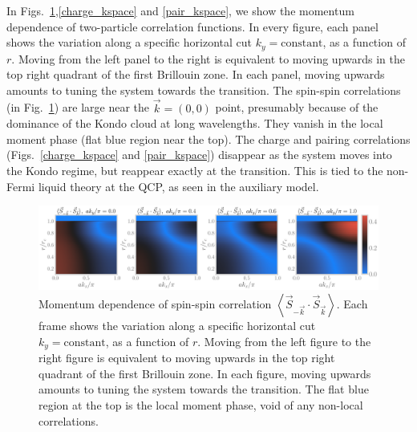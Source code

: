 \documentclass{report}
\numberwithin{equation}{section}
\begin{document}
In Figs.~\ref{spin_kspace},\ref{charge_kspace} and \ref{pair_kspace}, we show the momentum dependence of two-particle correlation functions. In every figure, each panel shows the variation along a specific horizontal cut \(k_y=\text{constant}\), as a function of \(r\). Moving from the left panel to the right is equivalent to moving upwards in the top right quadrant of the first Brillouin zone. In each panel, moving upwards amounts to tuning the system towards the transition. The spin-spin correlations (in Fig.~\ref{spin_kspace}) are large near the \(\vec k = \left( 0,0 \right) \) point, presumably because of the dominance of the Kondo cloud at long wavelengths. They vanish in the local moment phase (flat blue region near the top). The charge and pairing correlations (Figs.~\ref{charge_kspace} and \ref{pair_kspace}) disappear as the system moves into the Kondo regime, but reappear exactly at the transition. This is tied to the non-Fermi liquid theory at the QCP, as seen in the auxiliary model.
\begin{figure}[!htb]
\centering
\includegraphics[width=\textwidth]{spin_kspace_all.pdf}
\caption{Momentum dependence of spin-spin correlation \(\left<\vec{S}_{-\vec k}\cdot\vec{S}_{\vec k} \right>\). Each frame shows the variation along a specific horizontal cut \(k_y=\text{constant}\), as a function of \(r\). Moving from the left figure to the right figure is equivalent to moving upwards in the top right quadrant of the first Brillouin zone. In each figure, moving upwards amounts to tuning the system towards the transition. The flat blue region at the top is the local moment phase, void of any non-local correlations.}
\label{spin_kspace}
\end{figure}
\end{document}
